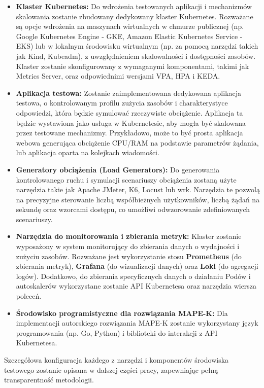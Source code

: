 \begin{itemize}
    \item \textbf{Klaster Kubernetes:} Do wdrożenia testowanych aplikacji i mechanizmów skalowania zostanie zbudowany dedykowany klaster Kubernetes. Rozważane są opcje wdrożenia na maszynach wirtualnych w chmurze publicznej (np. Google Kubernetes Engine - GKE, Amazon Elastic Kubernetes Service - EKS) lub w lokalnym środowisku wirtualnym (np. za pomocą narzędzi takich jak Kind, Kubeadm), z uwzględnieniem skalowalności i dostępności zasobów. Klaster zostanie skonfigurowany z wymaganymi komponentami, takimi jak Metrics Server, oraz odpowiednimi wersjami VPA, HPA i KEDA.
    \item \textbf{Aplikacja testowa:} Zostanie zaimplementowana dedykowana aplikacja testowa, o kontrolowanym profilu zużycia zasobów i charakterystyce odpowiedzi, która będzie symulować rzeczywiste obciążenie. Aplikacja ta będzie wystawiona jako usługa w Kubernetesie, aby mogła być skalowana przez testowane mechanizmy. Przykładowo, może to być prosta aplikacja webowa generująca obciążenie CPU/RAM na podstawie parametrów żądania, lub aplikacja oparta na kolejkach wiadomości.
    \item \textbf{Generatory obciążenia (Load Generators):} Do generowania kontrolowanego ruchu i symulacji scenariuszy obciążenia zostaną użyte narzędzia takie jak Apache JMeter, K6, Locust lub wrk. Narzędzia te pozwolą na precyzyjne sterowanie liczbą współbieżnych użytkowników, liczbą żądań na sekundę oraz wzorcami dostępu, co umożliwi odwzorowanie zdefiniowanych scenariuszy.
    \item \textbf{Narzędzia do monitorowania i zbierania metryk:} Klaster zostanie wyposażony w system monitorujący do zbierania danych o wydajności i zużyciu zasobów. Rozważane jest wykorzystanie stosu \textbf{Prometheus} (do zbierania metryk), \textbf{Grafana} (do wizualizacji danych) oraz \textbf{Loki} (do agregacji logów). Dodatkowo, do zbierania specyficznych danych o działaniu Podów i autoskalerów wykorzystane zostanie API Kubernetesa oraz narzędzia wiersza poleceń.
    \item \textbf{Środowisko programistyczne dla rozwiązania MAPE-K:} Dla implementacji autorskiego rozwiązania MAPE-K zostanie wykorzystany język programowania (np. Go, Python) i biblioteki do interakcji z API Kubernetesa.
\end{itemize}
Szczegółowa konfiguracja każdego z narzędzi i komponentów środowiska testowego zostanie opisana w dalszej części pracy, zapewniając pełną transparentność metodologii.


